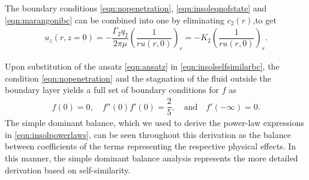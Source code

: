 \documentclass[]{jfm}
\begin{document}
The boundary conditions \eqref{eqn:nopenetration}, \eqref{eqn:insoleqnofstate} and \eqref{eqn:marangonibc} can be combined into one by eliminating $c_2(r)$,to get
\begin{align}
u_z(r, z=0) = -\dfrac{\Gamma_2 q_2}{2\pi \mu} \left( \dfrac{1}{r u(r, 0)} \right)_r = -K_2 \left( \dfrac{1}{r u(r, 0)} \right)_r. \label{eqn:insolselfsimilarbc}
\end{align}

Upon substitution of the ansatz \eqref{eqn:ansatz} in \eqref{eqn:insolselfsimilarbc}, the condition \eqref{eqn:nopenetration} and the stagnation of the fluid outside the boundary layer yields a full set of boundary conditions for $f$ as
\begin{align}
f(0) = 0, \quad f''(0) f'(0) = \dfrac{2}{5}, \quad \text{and} \quad f'(-\infty) = 0. \label{eqn:selfsimilarbc}
\end{align}
The simple dominant balance, which we used to derive the power-law expressions in \eqref{eqn:insolpowerlaws}, can be seen throughout this derivation as the balance between coefficients of the terms representing the respective physical effects.
In this manner, the simple dominant balance analysis represents the more detailed derivation based on self-similarity.
\end{document}
